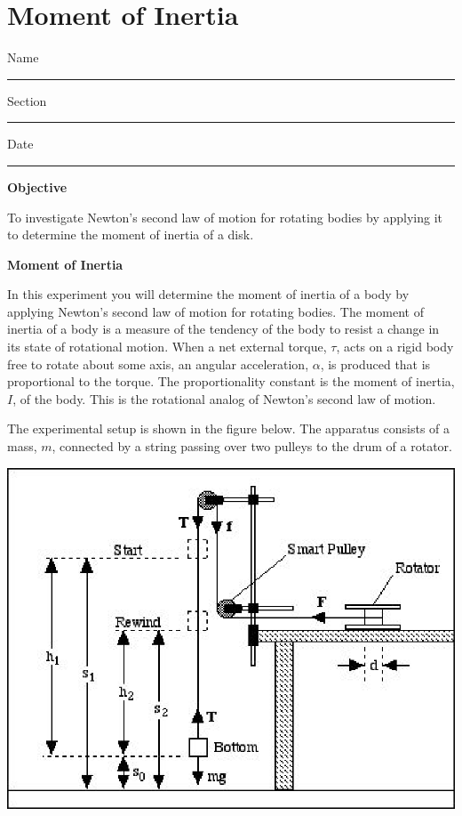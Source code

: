 
\section{Moment of Inertia}

Name \rule{2.0in}{0.1pt}\hfill{}Section \rule{1.0in}{0.1pt}\hfill{}Date \rule{1.0in}{0.1pt}

\textbf{Objective} 

To investigate Newton's second law of motion for rotating bodies by applying
it to determine the moment of inertia of a disk.

\textbf{Moment of Inertia} 

In this experiment you will determine the moment of inertia of a body by applying
Newton's second law of motion for rotating bodies. The moment of inertia of
a body is a measure of the tendency of the body to resist a change in its state
of rotational motion. When a net external torque, 
$\tau$, acts on a rigid body free
to rotate about some axis, an angular acceleration, 
$\alpha$, is produced that is
proportional to the torque. The proportionality constant is the moment of inertia,
$I$, of the body. This is the rotational analog of Newton's second law of motion. 

The experimental setup is shown in the figure below. The apparatus consists
of a mass, $m$, connected by a string passing over two pulleys to the drum of
a rotator.

\vspace{0.3cm}
{\par\centering \includegraphics{moment_inertia/moment_inertia_fig1.eps} \par}
\vspace{0.3cm}


